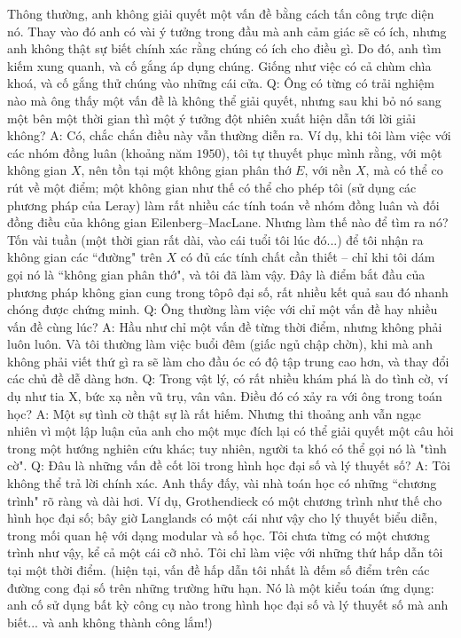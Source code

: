 \begin{multicols}{2}
	\vskip 0.1cm
	Thông thường, anh không giải quyết một vấn đề bằng cách tấn công trực diện nó. Thay vào đó anh có vài ý tưởng trong đầu mà anh cảm giác sẽ có ích, nhưng anh không thật sự biết chính xác rằng chúng có ích cho điều gì. Do đó, anh tìm kiếm xung quanh, và cố gắng áp dụng chúng. Giống như việc có cả chùm chìa khoá, và cố gắng thử chúng vào những cái cửa.
	\vskip 0.1cm
	Q: Ông có từng có trải nghiệm nào mà ông thấy một vấn đề là không thể giải quyết, nhưng sau khi bỏ nó sang một bên một thời gian thì một ý tưởng đột nhiên xuất hiện dẫn tới lời giải không?
	\vskip 0.1cm
	A: Có, chắc chắn điều này vẫn thường diễn ra. Ví dụ, khi tôi làm việc với các nhóm đồng luân (khoảng năm $1950$), tôi tự thuyết phục mình rằng, với một không gian $X$, nên tồn tại một không gian phân thớ $E$, với nền $X$, mà có thể co rút về một điểm; một không gian như thế có thể cho phép tôi (sử dụng các phương pháp của Leray) làm rất nhiều các tính toán về nhóm đồng luân và đối đồng điều của không gian Eilenberg--MacLane. Nhưng làm thế nào để tìm ra nó? Tốn vài tuần (một thời gian rất dài, vào cái tuổi tôi lúc đó...) để tôi nhận ra không gian các ``đường" trên $X$ có đủ các tính chất cần thiết -- chỉ khi tôi dám gọi nó là ``không gian phân thớ", và tôi đã làm vậy. Đây là điểm bắt đầu của phương pháp không gian cung trong tôpô đại số, rất nhiều kết quả sau đó nhanh chóng được chứng minh.
	\vskip 0.1cm
	Q: Ông thường làm việc với chỉ một vấn đề hay nhiều vấn đề cùng lúc?
	\vskip 0.1cm
	A: Hầu như chỉ một vấn đề từng thời điểm, nhưng không phải luôn luôn. Và tôi thường làm việc buổi đêm (giấc ngủ chập chờn), khi mà anh không phải viết thứ gì ra sẽ làm cho đầu óc có độ tập trung cao hơn, và thay đổi các chủ đề dễ dàng hơn.
	\vskip 0.1cm
	Q: Trong vật lý, có rất nhiều khám phá là do tình cờ, ví dụ như tia X, bức xạ nền vũ trụ, vân vân. Điều đó có xảy ra với ông trong toán học?
	\vskip 0.1cm
	A: Một sự tình cờ thật sự là rất hiếm. Nhưng thi thoảng anh vẫn ngạc nhiên vì một lập luận của anh cho một mục đích lại có thể giải quyết một câu hỏi trong một hướng nghiên cứu khác; tuy nhiên, người ta khó có thể gọi nó là "tình cờ".
	\vskip 0.1cm
	Q: Đâu là những vấn đề cốt lõi trong hình học đại số và lý thuyết số?
	\vskip 0.1cm
	A: Tôi không thể trả lời chính xác. Anh thấy đấy, vài nhà toán học có những ``chương trình" rõ ràng và dài hơi. Ví dụ, Grothendieck có một chương trình như thế cho hình học đại số; bây giờ Langlands có một cái như vậy cho lý thuyết biểu diễn, trong mối quan hệ với dạng modular và số học. Tôi chưa từng có một chương trình như vậy, kể cả một cái cỡ nhỏ. Tôi chỉ làm việc với những thứ hấp dẫn tôi tại một thời điểm. (hiện tại, vấn đề hấp dẫn tôi nhất là đếm số điểm trên các đường cong đại số trên những trường hữu hạn. Nó là một kiểu toán ứng dụng: anh cố sử dụng bất kỳ công cụ nào trong hình học đại số và lý thuyết số mà anh biết... và anh không thành công lắm!)

\end{multicols}
